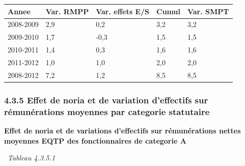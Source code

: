 \begin{longtable}[]{@{}lllll@{}}
\toprule
Annee & Var. RMPP & Var. effets E/S & Cumul & Var. SMPT\tabularnewline
\midrule
\endhead
2008-2009 & 2,9 & 0,2 & 3,2 & 3,2\tabularnewline
2009-2010 & 1,7 & -0,3 & 1,5 & 1,5\tabularnewline
2010-2011 & 1,4 & 0,3 & 1,6 & 1,6\tabularnewline
2011-2012 & 1,0 & 1,0 & 2,0 & 2,0\tabularnewline
2008-2012 & 7,2 & 1,2 & 8,5 & 8,5\tabularnewline
\bottomrule
\end{longtable}

\hypertarget{effet-de-noria-et-de-variation-deffectifs-sur-remunerations-moyennes-par-categorie-statutaire}{%
\subsubsection{4.3.5 Effet de noria et de variation d'effectifs sur
rémunérations moyennes par categorie
statutaire}\label{effet-de-noria-et-de-variation-deffectifs-sur-remunerations-moyennes-par-categorie-statutaire}}

\textbf{Effet de noria et de variations d'effectifs sur rémunérations
nettes moyennes EQTP des fonctionnaires de categorie A}

~\emph{Tableau 4.3.5.1}


